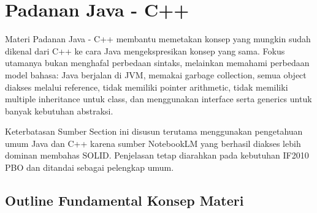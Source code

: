 \section{Padanan Java - C++}

Materi Padanan Java - C++ membantu memetakan konsep yang mungkin sudah dikenal dari C++ ke cara Java mengekspresikan konsep yang sama. Fokus utamanya bukan menghafal perbedaan sintaks, melainkan memahami perbedaan model bahasa: Java berjalan di JVM, memakai garbage collection, semua object diakses melalui reference, tidak memiliki pointer arithmetic, tidak memiliki multiple inheritance untuk class, dan menggunakan interface serta generics untuk banyak kebutuhan abstraksi.

\begin{cmt}{Keterbatasan Sumber}{}
Section ini disusun terutama menggunakan pengetahuan umum Java dan C++ karena sumber NotebookLM yang berhasil diakses lebih dominan membahas SOLID. Penjelasan tetap diarahkan pada kebutuhan IF2010 PBO dan ditandai sebagai pelengkap umum.
\end{cmt}

\subsection{Outline Fundamental Konsep Materi}

